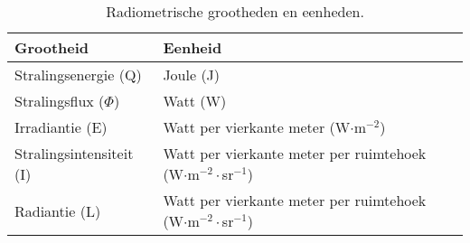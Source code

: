 \begin{table}
  \centering
  \begin{tabular}{@{}lll@{}}\toprule
    Grootheid                & Eenheid   \\ \midrule
    Stralingsenergie (Q)     & Joule (J) \\
    Stralingsflux ($\Phi$)   & Watt (W)  \\
    Irradiantie (E)          & Watt per vierkante meter (W$\cdot$m$^{-2}$) &              \\
    Stralingsintensiteit (I) & Watt per vierkante meter per ruimtehoek (W$\cdot$m$^{-2}\cdot$sr$^{-1}$) \\
    Radiantie (L)            & Watt per vierkante meter per ruimtehoek (W$\cdot$m$^{-2}\cdot$sr$^{-1}$) \\ \bottomrule
  \end{tabular}
  \caption{Radiometrische grootheden en eenheden.}
  \label{tbl:fw-eenheden}
\end{table}
